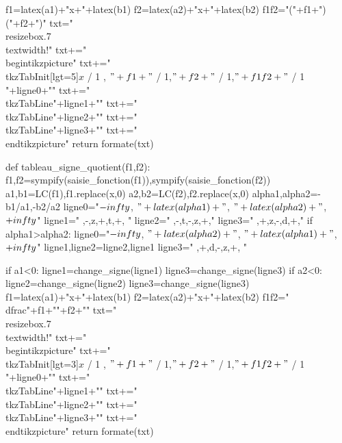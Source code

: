 \begin{pycode}
    f1=latex(a1)+"x+"+latex(b1)
    f2=latex(a2)+"x+"+latex(b2)
    f1f2="("+f1+")("+f2+")"
    txt="\\resizebox{.7\\textwidth}{!}{"
    txt+="\\begin{tikzpicture}"
    txt+="\\tkzTabInit[lgt=5]{$x$ / 1 , $"+f1+"$ / 1,$"+f2+"$ / 1,$"+f1f2+"$ / 1 }{"+ligne0+"}"
    txt+="\\tkzTabLine{"+ligne1+"}"
    txt+="\\tkzTabLine{"+ligne2+"}"
    txt+="\\tkzTabLine{"+ligne3+"}"
    txt+="\\end{tikzpicture}}"
    return formate(txt)

def tableau_signe_quotient(f1,f2):
    f1,f2=sympify(saisie_fonction(f1)),sympify(saisie_fonction(f2))
    a1,b1=LC(f1),f1.replace(x,0)
    a2,b2=LC(f2),f2.replace(x,0)
    alpha1,alpha2=-b1/a1,-b2/a2
    ligne0="$-\\infty$, $"+latex(alpha1)+"$, $"+latex(alpha2)+"$, $+\\infty$"
    ligne1=" ,-,z,+,t,+, "
    ligne2=" ,-,t,-,z,+,"
    ligne3=" ,+,z,-,d,+,"
    if alpha1>alpha2:
        ligne0="$-\\infty$, $"+latex(alpha2)+"$, $"+latex(alpha1)+"$, $+\\infty$"
        ligne1,ligne2=ligne2,ligne1
        ligne3=" ,+,d,-,z,+, "

    if a1<0:
        ligne1=change_signe(ligne1)
        ligne3=change_signe(ligne3)
    if a2<0:
        ligne2=change_signe(ligne2)
        ligne3=change_signe(ligne3)
    f1=latex(a1)+"x+"+latex(b1)
    f2=latex(a2)+"x+"+latex(b2)
    f1f2="\\dfrac{"+f1+"}{"+f2+"}"
    txt="\\resizebox{.7\\textwidth}{!}{"
    txt+="\\begin{tikzpicture}"
    txt+="\\tkzTabInit[lgt=3]{$x$ / 1 , $"+f1+"$ / 1,$"+f2+"$ / 1,$"+f1f2+"$ / 1 }{"+ligne0+"}"
    txt+="\\tkzTabLine{"+ligne1+"}"
    txt+="\\tkzTabLine{"+ligne2+"}"
    txt+="\\tkzTabLine{"+ligne3+"}"
    txt+="\\end{tikzpicture}}"
    return formate(txt)


\end{pycode}

